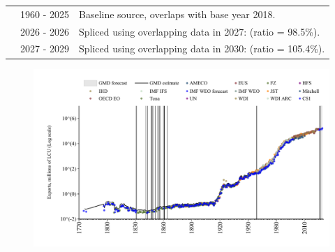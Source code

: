 \documentclass[12pt,a4paper,landscape]{article}
\begin{document}
\begin{adjustbox}{max totalsize={\paperwidth}{\paperheight},center}
\begin{minipage}[t][\textheight][t]{\textwidth}
\begin{table}[H]
\begin{tabular}{|l|l|l|}
\rowcolor{lightgray}\cite{OECD_EO}& 1960 - 2025 &Baseline source, overlaps with base year 2018.\\
\rowcolor{white}\cite{AMECO}& 2026 - 2026 &Spliced using overlapping data in 2027: (ratio = 98.5\%).\\
\rowcolor{lightgray}\cite{IMF_WEO_forecast}& 2027 - 2029 &Spliced using overlapping data in 2030: (ratio = 105.4\%).\\
\hline
\end{tabular}
\end{table}
\begin{figure}[H]
\centering
\includegraphics[width=\textwidth,height=0.6\textheight,keepaspectratio]{graphs/PRT_exports.pdf}
\end{figure}
\end{minipage}
\end{adjustbox}
\end{document}

